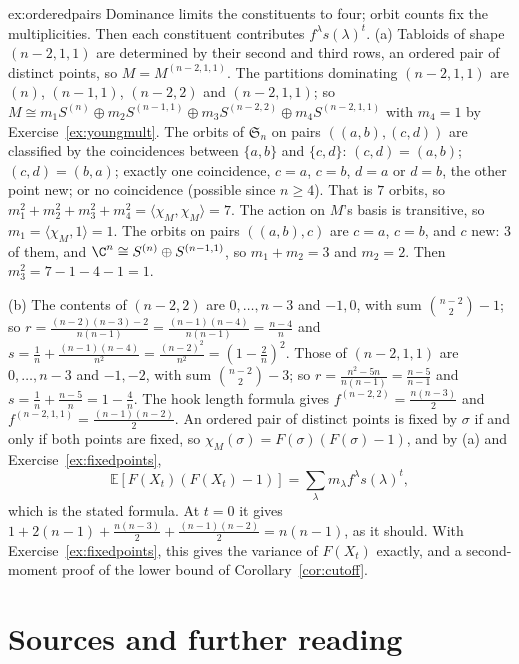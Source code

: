 \begin{solution}{ex:orderedpairs}
\idea Dominance limits the constituents to four; orbit counts fix the multiplicities. Then each constituent contributes $f^\lambda s(\lambda)^t$.
\writeup (a) Tabloids of shape $(n-2,1,1)$ are determined by their second and third rows, an ordered pair of distinct points, so $M=M^{(n-2,1,1)}$. The partitions dominating $(n-2,1,1)$ are $(n)$, $(n-1,1)$, $(n-2,2)$ and $(n-2,1,1)$; so
$M\cong m_1S^{(n)}\oplus m_2S^{(n-1,1)}\oplus m_3S^{(n-2,2)}\oplus m_4S^{(n-2,1,1)}$ with $m_4=1$ by Exercise~\ref{ex:youngmult}. The orbits of $\mathfrak S_n$ on pairs $((a,b),(c,d))$ are classified by the coincidences between $\{a,b\}$ and $\{c,d\}$: $(c,d)=(a,b)$; $(c,d)=(b,a)$; exactly one coincidence,
$c=a$, $c=b$, $d=a$ or $d=b$, the other point new; or no coincidence (possible since $n\ge4$). That is $7$ orbits, so $m_1^2+m_2^2+m_3^2+m_4^2=\langle\chi_M,\chi_M\rangle=7$. The action on $M$'s basis is transitive, so $m_1=\langle\chi_M,1\rangle=1$. The orbits on pairs $((a,b),c)$ are $c=a$, $c=b$, and $c$ new:
$3$ of them, and $\C^n\cong S^{(n)}\oplus S^{(n-1,1)}$, so $m_1+m_2=3$ and $m_2=2$. Then $m_3^2=7-1-4-1=1$.

(b) The contents of $(n-2,2)$ are $0,\dots,n-3$ and $-1,0$, with sum $\binom{n-2}2-1$; so $r=\frac{(n-2)(n-3)-2}{n(n-1)}=\frac{(n-1)(n-4)}{n(n-1)}=\frac{n-4}n$ and $s=\frac1n+\frac{(n-1)(n-4)}{n^2}=\frac{(n-2)^2}{n^2}=(1-\frac2n)^2$. Those of $(n-2,1,1)$ are $0,\dots,n-3$ and $-1,-2$, with sum $\binom{n-2}2-3$;
so $r=\frac{n^2-5n}{n(n-1)}=\frac{n-5}{n-1}$ and $s=\frac1n+\frac{n-5}n=1-\frac4n$. The hook length formula gives $f^{(n-2,2)}=\frac{n(n-3)}2$ and $f^{(n-2,1,1)}=\frac{(n-1)(n-2)}2$. An ordered pair of distinct points is fixed by $\sigma$ if and only if both points are fixed, so $\chi_M(\sigma)=F(\sigma)(F(\sigma)-1)$, and
by (a) and Exercise~\ref{ex:fixedpoints},
\[
\mathbb E[F(X_t)(F(X_t)-1)]=\sum_\lambda m_\lambda f^\lambda s(\lambda)^t,
\]
which is the stated formula. At $t=0$ it gives $1+2(n-1)+\frac{n(n-3)}2+\frac{(n-1)(n-2)}2=n(n-1)$, as it should. With Exercise~\ref{ex:fixedpoints}, this gives the variance of $F(X_t)$ exactly, and a second-moment proof of the lower bound of Corollary~\ref{cor:cutoff}.
\end{solution}

\section*{Sources and further reading}

